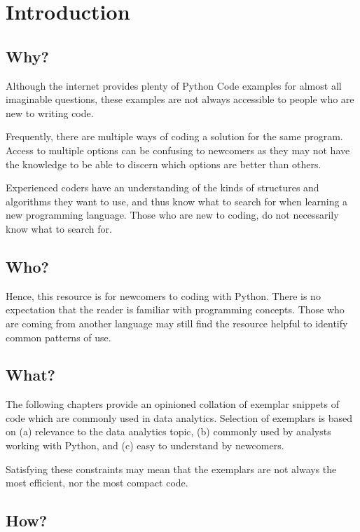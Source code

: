 \chapter{Introduction}
\label{chapter:introduction}

\section{Why?}

Although the internet provides plenty of Python Code examples for almost all imaginable questions, these examples are not always accessible to people who are new to writing code.

Frequently, there are multiple ways of coding a solution for the same program. Access to multiple options can be confusing to newcomers as they may not have the knowledge to be able to discern which options are better than others.

Experienced coders have an understanding of the kinds of structures and algorithms they want to use, and thus know what to search for when learning a new programming language. Those who are new to coding, do not necessarily know what to search for.

\section{Who?}

Hence, this resource is for newcomers to coding with Python. There is no expectation that the reader is familiar with programming concepts. Those who are coming from another language may still find the resource helpful to identify common patterns of use.

\section{What?}

The following chapters provide an opinioned collation of exemplar snippets of code which are commonly used in data analytics. Selection of exemplars is based on (a) relevance to the data analytics topic, (b) commonly used by analysts working with Python, and (c) easy to understand by newcomers.

Satisfying these constraints may mean that the exemplars are not always the most efficient, nor the most compact code.

\section{How?}

